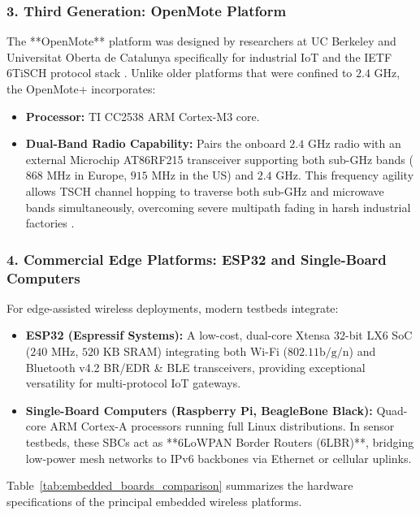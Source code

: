\subsubsection{3. Third Generation: OpenMote Platform}
The **OpenMote** platform was designed by researchers at UC Berkeley and Universitat Oberta de Catalunya specifically for industrial IoT and the IETF 6TiSCH protocol stack \cite{openmote_alvil}. Unlike older platforms that were confined to $2.4\text{~GHz}$, the OpenMote+ incorporates:
\begin{itemize}
    \item \textbf{Processor:} TI CC2538 ARM Cortex-M3 core.
    \item \textbf{Dual-Band Radio Capability:} Pairs the onboard $2.4\text{~GHz}$ radio with an external Microchip AT86RF215 transceiver supporting both sub-GHz bands ($868\text{~MHz}$ in Europe, $915\text{~MHz}$ in the US) and $2.4\text{~GHz}$. This frequency agility allows TSCH channel hopping to traverse both sub-GHz and microwave bands simultaneously, overcoming severe multipath fading in harsh industrial factories \cite{openmote_alvil}.
\end{itemize}

\subsubsection{4. Commercial Edge Platforms: ESP32 and Single-Board Computers}
For edge-assisted wireless deployments, modern testbeds integrate:
\begin{itemize}
    \item \textbf{ESP32 (Espressif Systems):} A low-cost, dual-core Xtensa 32-bit LX6 SoC ($240\text{~MHz}$, $520\text{~KB}$ SRAM) integrating both Wi-Fi ($802.11\text{b/g/n}$) and Bluetooth v4.2 BR/EDR \& BLE transceivers, providing exceptional versatility for multi-protocol IoT gateways.
    \item \textbf{Single-Board Computers (Raspberry Pi, BeagleBone Black):} Quad-core ARM Cortex-A processors running full Linux distributions. In sensor testbeds, these SBCs act as **6LoWPAN Border Routers (6LBR)**, bridging low-power mesh networks to IPv6 backbones via Ethernet or cellular uplinks.
\end{itemize}

Table~\ref{tab:embedded_boards_comparison} summarizes the hardware specifications of the principal embedded wireless platforms.

